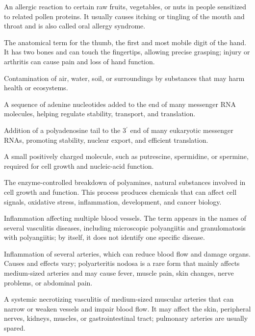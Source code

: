  An allergic reaction to certain raw fruits, vegetables, or nuts in people sensitized to related pollen proteins. It usually causes itching or tingling of the mouth and throat and is also called oral allergy syndrome.

 The anatomical term for the thumb, the first and most mobile digit of the hand. It has two bones and can touch the fingertips, allowing precise grasping; injury or arthritis can cause pain and loss of hand function.

 Contamination of air, water, soil, or surroundings by substances that may harm health or ecosystems.

 A sequence of adenine nucleotides added to the end of many messenger RNA molecules, helping regulate stability, transport, and translation.

 Addition of a polyadenosine tail to the 3$^{\prime}$ end of many eukaryotic messenger RNAs, promoting stability, nuclear export, and efficient translation.

 A small positively charged molecule, such as putrescine, spermidine, or spermine, required for cell growth and nucleic-acid function.

 The enzyme-controlled breakdown of polyamines, natural substances involved in cell growth and function. This process produces chemicals that can affect cell signals, oxidative stress, inflammation, development, and cancer biology.

 Inflammation affecting multiple blood vessels. The term appears in the names of several vasculitis diseases, including microscopic polyangiitis and granulomatosis with polyangiitis; by itself, it does not identify one specific disease.

 Inflammation of several arteries, which can reduce blood flow and damage organs. Causes and effects vary; polyarteritis nodosa is a rare form that mainly affects medium-sized arteries and may cause fever, muscle pain, skin changes, nerve problems, or abdominal pain.

 A systemic necrotizing vasculitis of medium-sized muscular arteries that can narrow or weaken vessels and impair blood flow. It may affect the skin, peripheral nerves, kidneys, muscles, or gastrointestinal tract; pulmonary arteries are usually spared.


